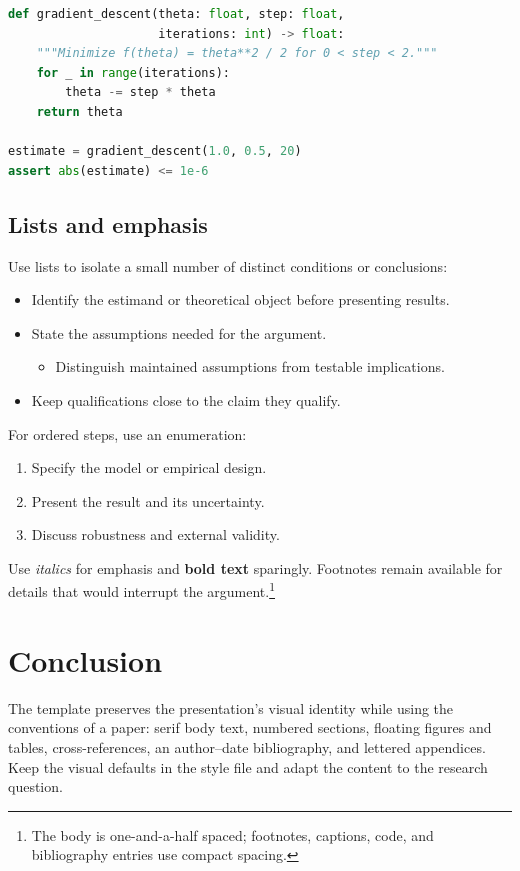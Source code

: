 \expandafter\documentclass\expandafter[\documentclassoptions]{article}
\begin{document}
\begin{lstlisting}[language=Python,caption={Gradient descent for the scalar objective},label={lst:gradient}]
def gradient_descent(theta: float, step: float,
                     iterations: int) -> float:
    """Minimize f(theta) = theta**2 / 2 for 0 < step < 2."""
    for _ in range(iterations):
        theta -= step * theta
    return theta

estimate = gradient_descent(1.0, 0.5, 20)
assert abs(estimate) <= 1e-6
\end{lstlisting}

\subsection{Lists and emphasis}

Use lists to isolate a small number of distinct conditions or conclusions:
\begin{itemize}
  \item Identify the estimand or theoretical object before presenting results.
  \item State the assumptions needed for the argument.
    \begin{itemize}
      \item Distinguish maintained assumptions from testable implications.
    \end{itemize}
  \item Keep qualifications close to the claim they qualify.
\end{itemize}
For ordered steps, use an enumeration:
\begin{enumerate}
  \item Specify the model or empirical design.
  \item Present the result and its uncertainty.
  \item Discuss robustness and external validity.
\end{enumerate}
Use \emph{italics} for emphasis and \textbf{bold text} sparingly. Footnotes
remain available for details that would interrupt the argument.\footnote{The
body is one-and-a-half spaced; footnotes, captions, code, and bibliography
entries use compact spacing.}

\section{Conclusion}

The template preserves the presentation's visual identity while using the
conventions of a paper: serif body text, numbered sections, floating figures
and tables, cross-references, an author--date bibliography, and lettered
appendices. Keep the visual defaults in the style file and adapt the content
to the research question.
\end{document}
